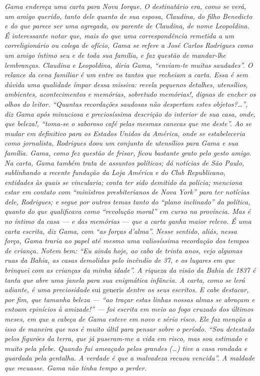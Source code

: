 \begin{didascalia}
\emph{Gama endereça uma carta para Nova Iorque. O destinatário era, como
se verá, um amigo querido, tanto dele quanto de sua esposa, Claudina, do
filho Benedicto e do que parece ser uma agregada, ou parente de
Claudina, de nome Leopoldina. É interessante notar que, mais do que uma
correspondência remetida a um correligionário ou colega de ofício, Gama
se refere a José Carlos Rodrigues como um amigo íntimo seu e de toda sua
família, e faz questão de mandar-lhe lembranças. Claudina e Leopoldina,
diria Gama, ``enviam-te muitas saudades''. O relance da cena familiar é um
entre os tantos que recheiam a carta. Essa é sem dúvida uma qualidade
ímpar dessa missiva: revela pequenos detalhes, utensílios, ambientes,
acontecimentos e memórias, sobretudo memórias!, dignas de encher os
olhos do leitor. ``Quantas recordações saudosas não despertam estes
objetos?\ldots{}'', diz Gama após minuciosa e preciosíssima descrição do
interior de sua casa, onde, que beleza!, ``toma-se o saboroso café pelas
mesmas canecas que me deste''. Ao se mudar em definitivo para os Estados
Unidos da América, onde se estabeleceria como jornalista, Rodrigues doou
um conjunto de utensílios para Gama e sua família. Gama, como fez
questão de frisar, ficou bastante grato pelo gesto amigo. Na carta, Gama
também trata de assuntos políticos; dá notícias de São Paulo,
sublinhando a recente fundação da Loja América e do Club Republicano,
entidades às quais se vincularia; conta ter sido demitido da polícia;
menciona estar em contato com ``ministros presbiterianos de Nova York''
para ter notícias dele, Rodrigues; e segue por outros temas tanto do
``plano inclinado'' da política, quanto do que qualificava como ``revolução
moral'' em curso na província. Mas é no íntimo da casa --- e das memórias
--- que a carta ganha maior relevo. É uma carta escrita, diz Gama, com
``as forças d'alma''. Nesse sentido, aliás, nessa força, Gama traria ao
papel até mesmo uma valiosíssima recordação dos tempos de criança. Notem
bem: ``Eu ainda hoje, ao cabo de trinta anos, vejo algumas ruas da Bahia,
as casas demolidas pelo incêndio de 37, e os lugares em que brinquei com
as crianças da minha idade''. A riqueza da visão da Bahia de 1837 é tanta
que abre uma janela para sua enigmática infância. A carta, como se lerá
adiante, é uma preciosidade} sui generis \emph{dentre os seus escritos.
E cabe destacar, por fim, que tamanha beleza --- ``ao traçar estas linhas
nossas almas se abraçam e entoam epinícios à amizade!'' --- foi escrita em
meio ao fogo cruzado dos últimos meses, em que a cabeça de Gama esteve
em novo e sério risco. Ele faz menção a isso de maneira que nos é muito
últil para pensar sobre o período. ``Sou detestado pelos figurões da
terra, que já puseram-me a vida em risco, mas sou estimado e muito pela
plebe. Quando fui ameaçado pelos grandes (\ldots{}) tive a casa rondada e
guardada pela gentalha. A verdade é que a malvadeza recuou vencida''. A
maldade que recuasse. Gama não tinha tempo a perder.}
\end{didascalia}



